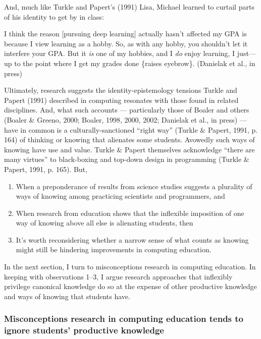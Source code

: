 And, much like Turkle and Papert's (1991) Lisa, Michael learned to
curtail parts of his identity to get by in class:

I think the reason {[}pursuing deep learning{]} actually hasn't affected
my GPA is because I view learning as a hobby. So, as with any hobby, you
shouldn't let it interfere your GPA. But it \emph{is} one of my hobbies,
and I \emph{do} enjoy learning, I just---up to the point where I get my
grades done \{raises eyebrow\}. (Danielak et al., in press)

Ultimately, research suggests the identity-epistemology tensions Turkle
and Papert (1991) described in computing resonates with those found in
related disciplines. And, what such accounts --- particularly those of
Boaler and others (Boaler \& Greeno, 2000; Boaler, 1998, 2000, 2002;
Danielak et al., in press) --- have in common is a culturally-sanctioned
``right way'' (Turkle \& Papert, 1991, p. 164) of thinking or knowing
that alienates some students. Avowedly such ways of knowing have use and
value. Turkle \& Papert themselves acknowledge ``there are many
virtues'' to black-boxing and top-down design in programming (Turkle \&
Papert, 1991, p. 165). But,

\begin{enumerate}
\def\labelenumi{\arabic{enumi}.}
\item
  When a preponderance of results from science studies suggests a
  plurality of ways of knowing among practicing scientists and
  programmers, and
\item
  When research from education shows that the inflexible imposition of
  one way of knowing above all else is alienating students, then
\item
  It's worth reconsidering whether a narrow sense of what counts as
  knowing might still be hindering improvements in computing education.
\end{enumerate}

In the next section, I turn to misconceptions research in computing
education. In keeping with observations 1--3, I argue research
approaches that inflexibly privilege canonical knowledge do so at the
expense of other productive knowledge and ways of knowing that students
have.

\subsubsection{Misconceptions research in computing education tends to
ignore students' productive
knowledge}\label{misconceptions-research-in-computing-education-tends-to-ignore-students-productive-knowledge}

